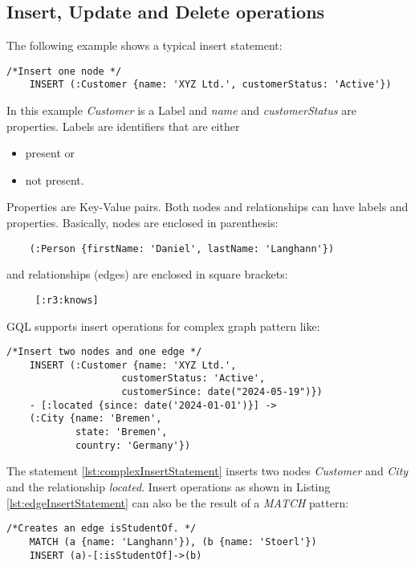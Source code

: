 \subsection{Insert, Update and Delete operations}
\label{subsec:iso:examples:insert_update_and_delete_operations}
The following example shows a typical insert statement:
\begin{lstlisting}[caption={Typical insert statement}, label={lst:insertStatement}]
    /*Insert one node */
	INSERT (:Customer {name: 'XYZ Ltd.', customerStatus: 'Active'})
\end{lstlisting}
In this example \textit{Customer} is a Label and \textit{name} and \textit{customerStatus}
are properties.\newline
Labels are identifiers that are either
\begin{itemize}
	\item present or
	\item not present.
\end{itemize}
Properties are Key-Value pairs.\newline
Both nodes and relationships can have labels and properties.
Basically, nodes are enclosed in parenthesis:
\begin{lstlisting}
	(:Person {firstName: 'Daniel', lastName: 'Langhann'})
\end{lstlisting}
and relationships (edges) are enclosed in square brackets:
\begin{lstlisting}
	 [:r3:knows]
\end{lstlisting}\clearpage
GQL supports insert operations for complex graph pattern like:
\begin{lstlisting}[caption={Complex insert statement}, label={lst:complexInsertStatement}]
    /*Insert two nodes and one edge */
	INSERT (:Customer {name: 'XYZ Ltd.', 
					customerStatus: 'Active',
					customerSince: date("2024-05-19")})
	- [:located {since: date('2024-01-01')}] ->
	(:City {name: 'Bremen',
			state: 'Bremen',
			country: 'Germany'})
\end{lstlisting}
The statement \ref{lst:complexInsertStatement} inserts two nodes \textit{Customer} and
\textit{City} and the relationship \textit{located}.\newline
Insert operations as shown in Listing \ref{lst:edgeInsertStatement} can also be the result of a \textit{MATCH} pattern:
\begin{lstlisting}[caption={Insert statement for an edge}, label={lst:edgeInsertStatement}] 
	/*Creates an edge isStudentOf. */
	MATCH (a {name: 'Langhann'}), (b {name: 'Stoerl'})
	INSERT (a)-[:isStudentOf]->(b)
\end{lstlisting}
